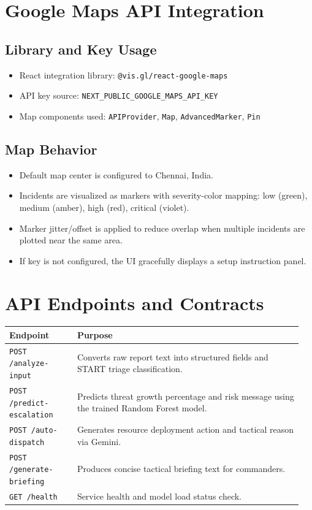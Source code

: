 \documentclass[12pt,a4paper]{article}
\begin{document}
\section{Google Maps API Integration}
\subsection{Library and Key Usage}
\begin{itemize}[leftmargin=1.5em]
  \item React integration library: \texttt{@vis.gl/react-google-maps}
  \item API key source: \texttt{NEXT\_PUBLIC\_GOOGLE\_MAPS\_API\_KEY}
  \item Map components used: \texttt{APIProvider}, \texttt{Map}, \texttt{AdvancedMarker}, \texttt{Pin}
\end{itemize}

\subsection{Map Behavior}
\begin{itemize}[leftmargin=1.5em]
  \item Default map center is configured to Chennai, India.
  \item Incidents are visualized as markers with severity-color mapping:
  low (green), medium (amber), high (red), critical (violet).
  \item Marker jitter/offset is applied to reduce overlap when multiple incidents are plotted near the same area.
  \item If key is not configured, the UI gracefully displays a setup instruction panel.
\end{itemize}

\section{API Endpoints and Contracts}
\begin{longtable}{p{0.22\linewidth} p{0.73\linewidth}}
\toprule
\textbf{Endpoint} & \textbf{Purpose} \\
\midrule
\texttt{POST /analyze-input} & Converts raw report text into structured fields and START triage classification. \\
\texttt{POST /predict-escalation} & Predicts threat growth percentage and risk message using the trained Random Forest model. \\
\texttt{POST /auto-dispatch} & Generates resource deployment action and tactical reason via Gemini. \\
\texttt{POST /generate-briefing} & Produces concise tactical briefing text for commanders. \\
\texttt{GET /health} & Service health and model load status check. \\
\bottomrule
\end{longtable}
\end{document}

